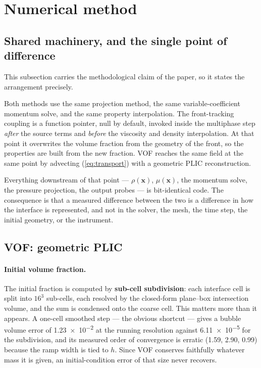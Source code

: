 \section{Numerical method}
\label{sec:method}


\subsection{Shared machinery, and the single point of difference}
\label{sec:shared}

This subsection carries the methodological claim of the paper, so it states the
arrangement precisely.

Both methods use the same projection method, the same variable-coefficient
momentum solve, and the same property interpolation. The front-tracking
coupling is a function pointer, null by default, invoked inside the multiphase
step \emph{after} the source terms and \emph{before} the viscosity and density
interpolation. At that point it overwrites the volume fraction from the
geometry of the front, so the properties are built from the new fraction. VOF
reaches the same field at the same point by advecting (\ref{eq:transport}) with
a geometric PLIC reconstruction.

Everything downstream of that point --- $\rho(\mathbf{x})$, $\mu(\mathbf{x})$,
the momentum solve, the pressure projection, the output probes --- is
bit-identical code. The consequence is that a measured difference between the
two is a difference in how the interface is represented, and not in the solver,
the mesh, the time step, the initial geometry, or the instrument.

\subsection{VOF: geometric PLIC}


\paragraph{Initial volume fraction.}
The initial fraction is computed by \textbf{sub-cell subdivision}: each
interface cell is split into $16^3$ sub-cells, each resolved by the closed-form
plane--box intersection volume, and the sum is condensed onto the coarse cell.
This matters more than it appears. A one-cell smoothed step --- the obvious
shortcut --- gives a bubble volume error of \num{1.23e-2} at the running
resolution against \num{6.11e-5} for the subdivision, and its measured order of
convergence is erratic (1.59, 2.90, 0.99) because the ramp width is tied to $h$.
Since VOF conserves faithfully whatever mass it is given, an initial-condition
error of that size never recovers.

